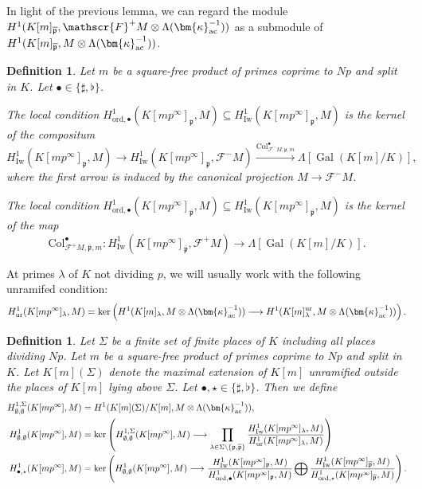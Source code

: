 \documentclass{amsart}
\numberwithin{equation}{section}
\newtheorem{defn}[theorem]{Definition}
\newcommand{\frk}{\mathfrak}
\newcommand{\Gal}{\operatorname{Gal}}
\newcommand{\ord}{\mathrm{ord}}
\newcommand{\Iw}{\mathrm{Iw}}
\newcommand{\col}{\mathrm{Col}}
\newcommand{\ac}{\textup{ac}}
\newcommand{\ur}{\textup{ur}}
\begin{document}
In light of the previous lemma, we can regard the module $H^1(K[m]_{\overline{\frk{p}}},\mathscr{F}^+M\otimes \Lambda(\bm{\kappa}_{\ac}^{-1}))$ as a submodule of $H^1(K[m]_{\overline{\frk{p}}},M\otimes \Lambda(\bm{\kappa}_{\ac}^{-1}))$.

\begin{defn}
    Let $m$ be a square-free product of primes coprime to $Np$ and split in $K$. Let $\bullet\in\lbrace \sharp,\flat\rbrace$.
        \item[i)] The local condition $H^1_{\ord,\bullet}(K[mp^\infty]_{\frk{p}},M)\subseteq H^1_{\Iw}(K[mp^\infty]_{\frk{p}},M)$ is the kernel of the compositum
        \[
        H^1_{\Iw}(K[mp^\infty]_{\frk{p}},M)\longrightarrow H^1_{\Iw}(K[mp^\infty]_{\frk{p}},\mathscr{F}^-M)\xrightarrow{\col_{\mathscr{F}^-M,\frk{p},m}^\bullet} \Lambda[\Gal(K[m]/K)],
        \]
        where the first arrow is induced by the canonical projection $M\rightarrow \mathscr{F}^-M$.
        \item[ii)] The local condition $H^1_{\ord,\bullet}(K[mp^\infty]_{\overline{\frk{p}}},M)\subseteq H^1_{\Iw}(K[mp^\infty]_{\overline{\frk{p}}},M)$  is the kernel of the map
        \[
        \col_{\mathscr{F}^+M,\overline{\frk{p}},m}^\bullet:H^1_{\Iw}(K[mp^\infty]_{\overline{\frk{p}}},\mathscr{F}^+M)\longrightarrow \Lambda[\Gal(K[m]/K)].
        \]
\end{defn}

At primes $\lambda$ of $K$ not dividing $p$, we will usually work with the following unramifed condition:
\[
H^1_{\ur}(K[mp^\infty]_\lambda,M)=\ker\left(H^1(K[m]_\lambda,M\otimes \Lambda(\bm{\kappa}_{\ac}^{-1}))\longrightarrow H^1(K[m]^{\ur}_\lambda,M\otimes \Lambda(\bm{\kappa}_{\ac}^{-1}))\right).
\]


\begin{defn}\label{def:Selmergroups}
    Let $\Sigma$ be a finite set of finite places of $K$ including all places dividing $Np$. Let $m$ be a square-free product of primes coprime to $Np$ and split in $K$. Let $K[m](\Sigma)$ denote the maximal extension of $K[m]$ unramified outside the places of $K[m]$ lying above $\Sigma$. Let $\bullet,\star\in\lbrace \sharp,\flat\rbrace$. Then we define
    \begin{align*}
        H^{1,\Sigma}_{\emptyset,\emptyset}(K[mp^\infty],M)&=H^1(K[m](\Sigma)/K[m],M\otimes \Lambda(\bm{\kappa}_{\ac}^{-1})), \\
        H^{1}_{\emptyset,\emptyset}(K[mp^\infty],M)&=\ker\left(H^{1,\Sigma}_{\emptyset,\emptyset}(K[mp^\infty],M)\longrightarrow \prod_{\lambda\in \Sigma\setminus \lbrace \frk{p},\overline{\frk{p}}\rbrace}\frac{H^1_{\Iw}(K[mp^\infty]_{\lambda}, M)}{H^1_{\ur}(K[mp^\infty]_{\lambda},M)}\right) \\
        H^{1}_{\bullet,\star}(K[mp^\infty],M)&=\ker\left(H^{1}_{\emptyset,\emptyset}(K[mp^\infty],M)\longrightarrow \frac{H^1_{\Iw}(K[mp^\infty]_{\frk{p}}, M)}{H^1_{\ord,\bullet}(K[mp^\infty]_{\frk{p}},M)} \bigoplus \frac{H^1_{\Iw}(K[mp^\infty]_{\overline{\frk{p}}}, M)}{H^1_{\ord,\star}(K[mp^\infty]_{\overline{\frk{p}}},M)} \right).
    \end{align*}
\end{defn}
\end{document}
